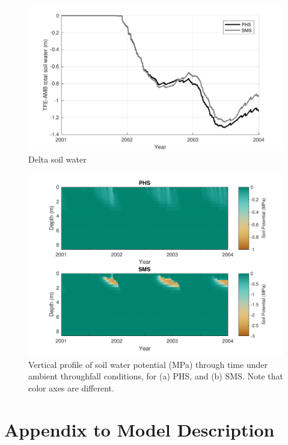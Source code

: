 \documentclass[draft,linenumbers]{agujournal}
\begin{document}
        \clearpage
    \begin{figure}[h]
     \centering
     \includegraphics[width=30pc]{../figs2/suppsoilwater.pdf}
     \caption{Delta soil water}
     \label{supp:buff}
  \end{figure}
  
  
        \clearpage
    \begin{figure}[h]
     \centering
     \includegraphics[width=30pc]{../figs2/suppsmp.pdf}
     \caption{Vertical profile of soil water potential (MPa) through time under ambient throughfall conditions, for
     (a) PHS, and 
     (b) SMS.
     Note that color axes are different. }
     \label{supp:smp}
  \end{figure}



\section{Appendix to Model Description}
\end{document}
